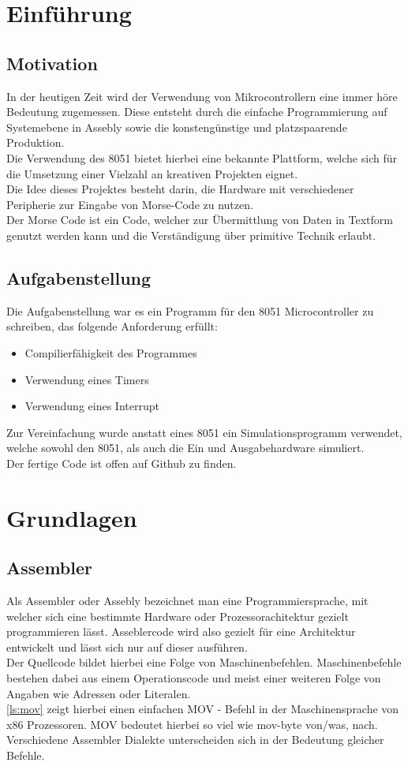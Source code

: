 \documentclass[a4paper,12pt]{article}
\begin{document}
	\section{Einführung}
	\subsection{Motivation}
	In der heutigen Zeit wird der Verwendung von Mikrocontrollern eine immer höre Bedeutung zugemessen. Diese entsteht durch die einfache Programmierung auf Systemebene in Assebly sowie die konstengünstige und platzspaarende Produktion.\\
	Die Verwendung des 8051  bietet hierbei eine bekannte Plattform, welche sich für die Umsetzung einer Vielzahl an kreativen Projekten eignet.\\
	Die Idee dieses Projektes besteht darin, die Hardware mit verschiedener Peripherie zur Eingabe von Morse-Code zu nutzen.\\
	Der Morse Code ist ein Code, welcher zur Übermittlung von Daten in Textform genutzt werden kann und die Verständigung über primitive Technik erlaubt. 
	\subsection{Aufgabenstellung}
	Die Aufgabenstellung war es ein Programm für den 8051 Microcontroller zu schreiben, das folgende Anforderung erfüllt:
	\begin{itemize}
		\item Compilierfähigkeit des Programmes
		\item Verwendung eines Timers
		\item Verwendung eines Interrupt
	\end{itemize}
	Zur Vereinfachung wurde anstatt eines 8051 ein Simulationsprogramm verwendet, welche sowohl den 8051, als auch die Ein und Ausgabehardware simuliert.\\
	Der fertige Code ist offen auf Github zu finden.
	
	\newpage
	
	\section{Grundlagen}
	\subsection{Assembler}
	Als Assembler oder Assebly bezeichnet man eine Programmiersprache, mit welcher sich eine bestimmte Hardware oder Prozessorachitektur gezielt programmieren lässt. Asseblercode wird also gezielt für eine Architektur entwickelt und lässt sich nur auf dieser ausführen.\\
	Der Quellcode bildet hierbei eine Folge von Maschinenbefehlen. Maschinenbefehle bestehen dabei aus einem Operationscode und meist einer weiteren Folge von Angaben wie Adressen oder Literalen.\\
	\ref{ls:mov} zeigt hierbei einen einfachen MOV - Befehl in  der Maschinensprache von x86 Prozessoren. MOV bedeutet hierbei so viel wie mov-byte von/was, nach. Verschiedene Assembler Dialekte unterscheiden sich in der Bedeutung gleicher Befehle.\\
	
\end{document}
